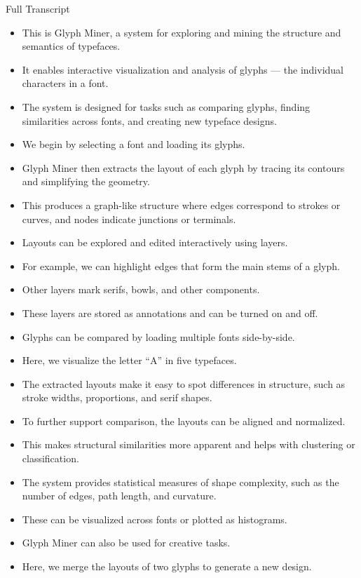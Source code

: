 \documentclass{beamer}
\begin{document}
\begin{frame}[allowframebreaks]{Full Transcript}
\scriptsize
\begin{itemize}
\item This is Glyph Miner, a system for exploring and mining the structure and semantics of typefaces.
\item It enables interactive visualization and analysis of glyphs — the individual characters in a font.
\item The system is designed for tasks such as comparing glyphs, finding similarities across fonts, and creating new typeface designs.
\item We begin by selecting a font and loading its glyphs.
\item Glyph Miner then extracts the layout of each glyph by tracing its contours and simplifying the geometry.
\item This produces a graph-like structure where edges correspond to strokes or curves, and nodes indicate junctions or terminals.
\item Layouts can be explored and edited interactively using layers.
\item For example, we can highlight edges that form the main stems of a glyph.
\item Other layers mark serifs, bowls, and other components.
\item These layers are stored as annotations and can be turned on and off.
\item Glyphs can be compared by loading multiple fonts side-by-side.
\item Here, we visualize the letter “A” in five typefaces.
\item The extracted layouts make it easy to spot differences in structure, such as stroke widths, proportions, and serif shapes.
\item To further support comparison, the layouts can be aligned and normalized.
\item This makes structural similarities more apparent and helps with clustering or classification.
\item The system provides statistical measures of shape complexity, such as the number of edges, path length, and curvature.
\item These can be visualized across fonts or plotted as histograms.
\item Glyph Miner can also be used for creative tasks.
\item Here, we merge the layouts of two glyphs to generate a new design.

\end{itemize}
\end{frame}
\end{document}

